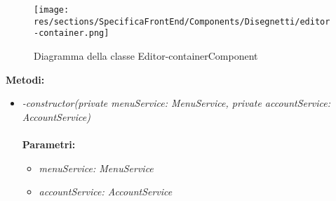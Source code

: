 \begin{figure}[h!]
	\centering
	\texttt{[image: res/sections/SpecificaFrontEnd/Components/Disegnetti/editor-container.png]}
	\caption{Diagramma della classe Editor-containerComponent}
\end{figure}

	\item \textbf{Metodi:}
		\begin{itemize}
			\item \emph{-constructor(private menuService: MenuService,
    private accountService: AccountService)}\\
    		\\
    		\textbf{Parametri:}
    		\begin{itemize}
    			\item \emph{menuService: MenuService}\\
    			    			
    			\item \emph{accountService: AccountService}\\
    			
    		\end{itemize}
\end{itemize}